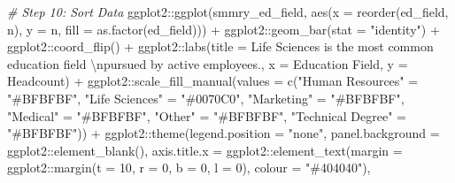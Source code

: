\documentclass[
]{book}
\newenvironment{Shaded}{\begin{snugshade}}{\end{snugshade}}
\newcommand{\AttributeTok}[1]{\textcolor[rgb]{0.77,0.63,0.00}{#1}}
\newcommand{\CommentTok}[1]{\textcolor[rgb]{0.56,0.35,0.01}{\textit{#1}}}
\newcommand{\DecValTok}[1]{\textcolor[rgb]{0.00,0.00,0.81}{#1}}
\newcommand{\FunctionTok}[1]{\textcolor[rgb]{0.00,0.00,0.00}{#1}}
\newcommand{\NormalTok}[1]{#1}
\newcommand{\OtherTok}[1]{\textcolor[rgb]{0.56,0.35,0.01}{#1}}
\newcommand{\SpecialCharTok}[1]{\textcolor[rgb]{0.00,0.00,0.00}{#1}}
\newcommand{\StringTok}[1]{\textcolor[rgb]{0.31,0.60,0.02}{#1}}
\begin{document}
\begin{Shaded}
\begin{Highlighting}[]
\CommentTok{\# Step 10: Sort Data}
\NormalTok{ggplot2}\SpecialCharTok{::}\FunctionTok{ggplot}\NormalTok{(smmry\_ed\_field, }\FunctionTok{aes}\NormalTok{(}\AttributeTok{x =} \FunctionTok{reorder}\NormalTok{(ed\_field, n), }\AttributeTok{y =}\NormalTok{ n, }\AttributeTok{fill =} \FunctionTok{as.factor}\NormalTok{(ed\_field))) }\SpecialCharTok{+}
\NormalTok{ggplot2}\SpecialCharTok{::}\FunctionTok{geom\_bar}\NormalTok{(}\AttributeTok{stat =} \StringTok{"identity"}\NormalTok{) }\SpecialCharTok{+}
\NormalTok{ggplot2}\SpecialCharTok{::}\FunctionTok{coord\_flip}\NormalTok{() }\SpecialCharTok{+}
\NormalTok{ggplot2}\SpecialCharTok{::}\FunctionTok{labs}\NormalTok{(}\AttributeTok{title =} \StringTok{\textquotesingle{}Life Sciences is the most common education field }\SpecialCharTok{\textbackslash{}n}\StringTok{pursued by active employees.\textquotesingle{}}\NormalTok{, }\AttributeTok{x =} \StringTok{\textquotesingle{}Education Field\textquotesingle{}}\NormalTok{, }\AttributeTok{y =} \StringTok{\textquotesingle{}Headcount\textquotesingle{}}\NormalTok{) }\SpecialCharTok{+}
\NormalTok{ggplot2}\SpecialCharTok{::}\FunctionTok{scale\_fill\_manual}\NormalTok{(}\AttributeTok{values =} \FunctionTok{c}\NormalTok{(}\StringTok{"Human Resources"} \OtherTok{=} \StringTok{"\#BFBFBF"}\NormalTok{, }
                                      \StringTok{"Life Sciences"} \OtherTok{=} \StringTok{"\#0070C0"}\NormalTok{, }
                                      \StringTok{"Marketing"} \OtherTok{=} \StringTok{"\#BFBFBF"}\NormalTok{, }
                                      \StringTok{"Medical"} \OtherTok{=} \StringTok{"\#BFBFBF"}\NormalTok{,}
                                      \StringTok{"Other"} \OtherTok{=} \StringTok{"\#BFBFBF"}\NormalTok{,}
                                      \StringTok{"Technical Degree"} \OtherTok{=} \StringTok{"\#BFBFBF"}\NormalTok{)) }\SpecialCharTok{+}
\NormalTok{ggplot2}\SpecialCharTok{::}\FunctionTok{theme}\NormalTok{(}\AttributeTok{legend.position =} \StringTok{"none"}\NormalTok{,}
               \AttributeTok{panel.background =}\NormalTok{ ggplot2}\SpecialCharTok{::}\FunctionTok{element\_blank}\NormalTok{(),}
               \AttributeTok{axis.title.x =}\NormalTok{ ggplot2}\SpecialCharTok{::}\FunctionTok{element\_text}\NormalTok{(}\AttributeTok{margin =}\NormalTok{ ggplot2}\SpecialCharTok{::}\FunctionTok{margin}\NormalTok{(}\AttributeTok{t =} \DecValTok{10}\NormalTok{, }\AttributeTok{r =} \DecValTok{0}\NormalTok{, }\AttributeTok{b =} \DecValTok{0}\NormalTok{, }\AttributeTok{l =} \DecValTok{0}\NormalTok{), }\AttributeTok{colour =} \StringTok{"\#404040"}\NormalTok{),}

\end{Highlighting}
\end{Shaded}
\end{document}
